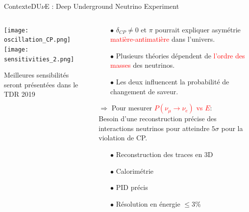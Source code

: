   \begin{frame}{Contexte}{DU$\nu$E : Deep Underground Neutrino Experiment}
    \begin{scriptsize}
    	\begin{columns}
    		\begin{column}{0.6\textwidth}
    			\centering
    			\texttt{[image: oscillation\_CP.png]}\\\vspace{0.2cm}
    			 \texttt{[image: sensitivities\_2.png]}\\
    			 \begin{scriptsize}
    			 	Meilleures sensibilités seront présentées dans le TDR 2019
    			 \end{scriptsize}
    		\end{column}
    		\begin{column}{0.4\textwidth}
    			\begin{itemize}
	    			\item[$\bullet$]$\delta_{CP}\ne0$ et $\pi$ pourrait expliquer asymétrie \textcolor{red}{matière-antimatière} dans l'univers.\\
	    			\item[$\bullet$] Plusieurs théories dépendent de \textcolor{red}{l'ordre des masses} des neutrinos.
	    			\item[$\bullet$] Les deux influencent la probabilité de changement de saveur.
	    		\end{itemize}
    			\begin{scriptsize}
	    			$\Rightarrow$ Pour mesurer \textcolor{red}{$P(\nu_{\mu}\to\nu_e)$ vs $E$}: \\
	    			Besoin d'une reconstruction précise des interactions neutrinos pour atteindre $5\sigma$ pour la violation de CP.
    			\end{scriptsize}
    			\begin{itemize}
    				\item[$\bullet$] Reconstruction des traces en 3D
    				\item[$\bullet$] Calorimétrie
    				\item[$\bullet$] PID précis
    				\item[$\bullet$]Résolution en énergie $\leq$3\%
    			\end{itemize}
    		\end{column}
    	\end{columns}
	  \end{scriptsize}
    \end{frame}

